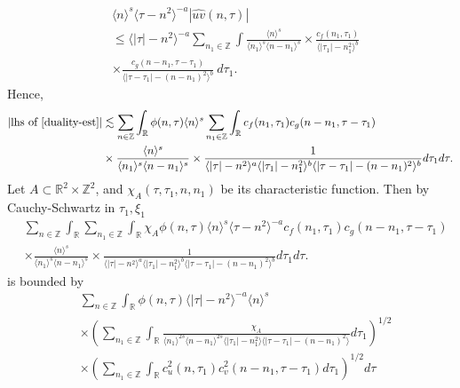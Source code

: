 \documentclass[12pt,reqno]{amsart}
\numberwithin{equation}{section}  %
\numberwithin{figure}{section}
\newcommand{\rr}{\mathbb{R}}
\newcommand{\zz}{\mathbb{Z}}
\newcommand{\wh}{\widehat}
\theoremstyle{plain}
\theoremstyle{definition}
\theoremstyle{remark}
\begin{document}
%
%
\begin{equation}
	\label{convo-est-starting-pnt}
	\begin{split}
		 & \langle n \rangle^s \langle \tau - n^{2} \rangle^{-a} | \wh{uv}\left( 
		n, \tau \right) |
		\\
		& \le \langle |\tau| - n^{2} \rangle^{-a}
		\sum_{n_1 \in \zz} \int \frac{\langle n \rangle^{s}}{\langle n_1 \rangle^s
    \langle n - n_1 \rangle^s} 
		\times \frac{c_f(n_1, \tau_1)}{\langle |\tau_1| - n_1^{2} \rangle ^{b}}
		\\
		& \times
		\frac{c_g(n - n_1, \tau - \tau_1 )}{\langle |\tau - \tau_1| - (n - n_1)^{2}
    \rangle^{b}}\ d \tau_1.
	\end{split}
\end{equation}
%
%
Hence, 
%
%
\begin{equation}
  \label{pre-fubini-int-form}
	\begin{split}
    |\text{lhs of} \ \eqref{duality-est}|
	& \lesssim \sum_{n \in \zz} \int_{\rr} \phi(n, \tau) \langle n \rangle^s 
  \sum_{n_1 \in \zz}
  \int_{\rr} c_f(n_1, \tau_1)
		c_g(n - n_1, \tau - \tau_1 )
		\\
    & \times \frac{\langle n \rangle ^{s}}{\langle n_{1} \rangle ^{s} \langle
    n-n_{1} \rangle ^{s}} \times \frac{1}{\langle |\tau| - n^{2} \rangle
    ^{a}\langle |\tau_{1}|-n_{1}^{2} \rangle ^{b}\langle | \tau -
    \tau_{1}|-(n - n_{1})^{2}
    \rangle ^{b}} d \tau_1 d \tau.
	\end{split}
\end{equation}
%
Let $A \subset \rr^{2} \times \zz^{2}$, and $\chi_{A}(\tau, \tau_{1}, n, n_{1})$
be its
characteristic function. Then by Cauchy-Schwartz in
$\tau_{1}, \xi_{1}$
\begin{equation*}
	\begin{split}
    & \sum_{n \in \zz} \int_{\rr}   \sum_{n_1 \in \zz}
    \int_{\rr} \chi_{A}
    \phi(n, \tau) \langle n \rangle^s \langle \tau - n^{2} \rangle^{-a}
  c_f(n_1, \tau_1)
		c_g(n - n_1, \tau - \tau_1 )
		\\
    & \times \frac{\langle n \rangle ^{s}}{\langle n_{1} \rangle ^{s} \langle
    n-n_{1} \rangle ^{s}} \times \frac{1}{\langle |\tau| - n^{2} \rangle
    ^{a}\langle |\tau_{1}|-n_{1}^{2} \rangle ^{b}\langle | \tau -
    \tau_{1}|-(n - n_{1})^{2}
    \rangle ^{b}} d \tau_1 d \tau.
	\end{split}
\end{equation*}
%
is bounded by 
%
%
\begin{equation}
	\label{10g}
	\begin{split}
    & \sum_{n \in \zz} \int_{\rr} \phi(n, \tau) \langle | \tau | - n^{2} \rangle
    ^{-a} \langle n \rangle ^{s}
    \\
    & \times \left( \sum_{n_{1} \in \zz} \int_{\rr}
    \frac{\chi_{A}}{\langle n_{1} \rangle ^{2s} \langle n-n_{1} \rangle ^{2s} \langle |
    \tau_{1} | - n_{1}^{2}\rangle  \langle | \tau - \tau_{1} | -
    (n - n_{1})^{2} \rangle } d \tau_{1} \right)^{1/2}
    \\
    & \times \left( \sum_{n_{1} \in \zz} \int_{\rr} c_{u}^{2}(n, \tau_{1})
    c_{v}^{2}(n - n_{1}, \tau - \tau_{1}) d \tau_{1} \right)^{1/2} d \tau
  \end{split}
\end{equation}
\end{document}
